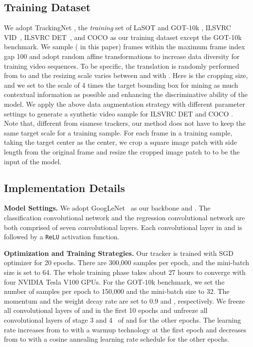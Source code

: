 \documentclass[final]{cvpr}
\begin{document}
\subsection{Training Dataset}\label{subsec:training-dataset}
We adopt TrackingNet \cite{muller2018trackingnet}, the \textit{training} set of LaSOT \cite{fan2019lasot} and GOT-10k \cite{huang2019got}, ILSVRC VID~\cite{russakovsky2015imagenet}, ILSVRC DET~\cite{russakovsky2015imagenet}, and COCO \cite{lin2014microsoft} as our training dataset except the GOT-10k benchmark.
We sample  ( in this paper) frames within the maximum frame index gap 100 and adopt random affine transformations to increase data diversity for training video sequences.
To be specific, the translation is randomly performed from  to  and the resizing scale varies between  and  with .
Here  is the cropping size, and we set  to the scale of 4 times the target bounding box for mining as much contextual information as possible and enhancing the discriminative ability of the model.
We apply the above data augmentation strategy with different parameter settings to generate a synthetic video sample for ILSVRC DET \cite{russakovsky2015imagenet} and COCO \cite{lin2014microsoft}.
Note that, different from siamese trackers, our method does not have to keep the same target scale for a training sample.
For each frame in a training sample, taking the target center as the center, we crop a square image patch with side length  from the original frame and resize the cropped image patch to  to be the input of the model.

\subsection{Implementation Details}
\textbf{Model Settings.}
We adopt GoogLeNet~\cite{szegedy2015going} as our backbone  and .
The classification convolutional network  and the regression convolutional network  are both comprised of seven convolutional layers.
Each convolutional layer in  and  is followed by a \verb!ReLU! activation function.
\par
\textbf{Optimization and Training Strategies.}
Our tracker is trained with SGD optimizer for 20 epochs.
There are 300,000 samples per epoch, and the mini-batch size is set to 64.
The whole training phase takes about 27 hours to converge with four NVIDIA Tesla V100 GPUs.
For the GOT-10k benchmark, we set the number of samples per epoch to 150,000 and the mini-batch size to 32.
The momentum and the weight decay rate are set to 0.9 and , respectively.
We freeze all convolutional layers of  and  in the first 10 epochs and unfreeze all convolutional layers of stage 3 and 4~\cite{szegedy2015going} of  and  for the other epochs.
The learning rate increases from  to  with a warmup technology at the first epoch and decreases from  to  with a cosine annealing learning rate schedule for the other epochs.
\end{document}
